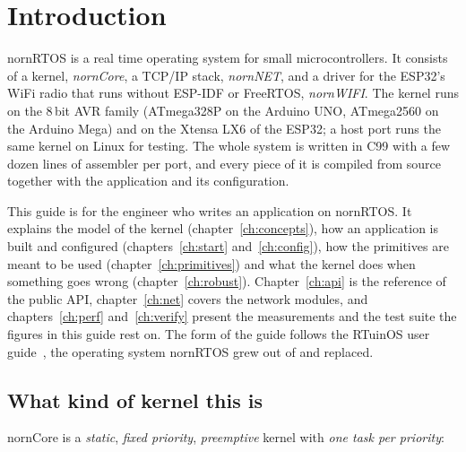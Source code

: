\chapter{Introduction}
\label{ch:intro}

nornRTOS is a real time operating system for small microcontrollers. It consists of a
kernel, \emph{nornCore}, a TCP/IP stack, \emph{nornNET}, and a driver for the ESP32's
WiFi radio that runs without ESP-IDF or FreeRTOS, \emph{nornWIFI}. The kernel runs on the
8\,bit AVR family (ATmega328P on the Arduino UNO, ATmega2560 on the Arduino Mega) and on
the Xtensa LX6 of the ESP32; a host port runs the same kernel on Linux for testing. The
whole system is written in C99 with a few dozen lines of assembler per port, and every
piece of it is compiled from source together with the application and its configuration.

This guide is for the engineer who writes an application on nornRTOS. It explains the
model of the kernel (chapter~\ref{ch:concepts}), how an application is built and
configured (chapters~\ref{ch:start} and~\ref{ch:config}), how the primitives are meant to
be used (chapter~\ref{ch:primitives}) and what the kernel does when something goes wrong
(chapter~\ref{ch:robust}). Chapter~\ref{ch:api} is the reference of the public API,
chapter~\ref{ch:net} covers the network modules, and chapters~\ref{ch:perf}
and~\ref{ch:verify} present the measurements and the test suite the figures in this guide
rest on. The form of the guide follows the RTuinOS user guide~\cite{rtuinos}, the
operating system nornRTOS grew out of and replaced.

\section{What kind of kernel this is}

nornCore is a \emph{static}, \emph{fixed priority}, \emph{preemptive} kernel with
\emph{one task per priority}:

